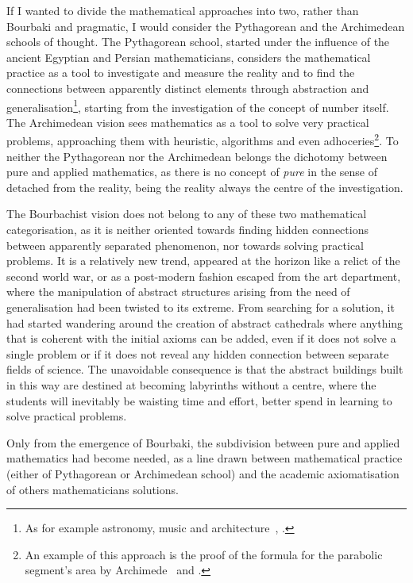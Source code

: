 \documentclass[]{scrartcl}
\theoremstyle{definition}
\begin{document}
If I wanted to divide the mathematical approaches into two, rather than Bourbaki and pragmatic, I would consider the Pythagorean and the Archimedean schools of thought. The Pythagorean school, started under the influence of the ancient Egyptian and Persian mathematicians, considers the mathematical practice as a tool to investigate and measure the reality and to find the connections between apparently distinct elements through abstraction and generalisation\footnote{
    As for example astronomy, music and architecture~\cite{robins1995mathematics}, \cite{boyer2011history}.
}, starting from the investigation of the concept of number itself.
The Archimedean vision sees mathematics as a tool to solve very practical problems, approaching them with heuristic, algorithms and even adhoceries\footnote{
    An example of this approach is the proof of the formula for the parabolic segment's area by Archimede~\cite{boyer2011history} and \cite{strogatz2019infinite}.
}. To neither the Pythagorean nor the Archimedean belongs the dichotomy between pure and applied mathematics, as there is no concept of \emph{pure} in the sense of detached from the reality, being the reality always the centre of the investigation.

The Bourbachist vision does not belong to any of these two mathematical categorisation, as it is neither oriented towards finding hidden connections between apparently separated phenomenon, nor towards solving practical problems. It is a relatively new trend, appeared at the horizon like a relict of the second world war, or as a post-modern fashion escaped from the art department, where the manipulation of abstract structures arising from the need of generalisation had been twisted to its extreme. From searching for a solution, it had started wandering around the creation of abstract cathedrals where anything that is coherent with the initial axioms can be added, even if it does not solve a single problem or if it does not reveal any hidden connection between separate fields of science. The unavoidable consequence is that the abstract buildings built in this way are destined at becoming labyrinths without a centre, where the students will inevitably be waisting time and effort, better spend in learning to solve practical problems.

Only from the emergence of Bourbaki, the subdivision between pure and applied mathematics had become needed, as a line drawn between mathematical practice (either of Pythagorean or Archimedean school) and the academic axiomatisation of others mathematicians solutions.
\end{document}

